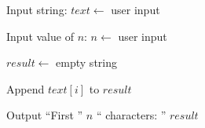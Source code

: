 \begin{algorithm}
\caption{Extract First N Characters from a String}
\begin{algorithmic}[1]

\STATE Input string:
\STATE $text \gets$ user input

\STATE Input value of $n$:
\STATE $n \gets$ user input

\STATE $result \gets$ empty string

    \STATE Append $text[i]$ to $result$
\ENDFOR

\STATE Output ``First '' $n$ `` characters: '' $result$

\end{algorithmic}
\end{algorithm}